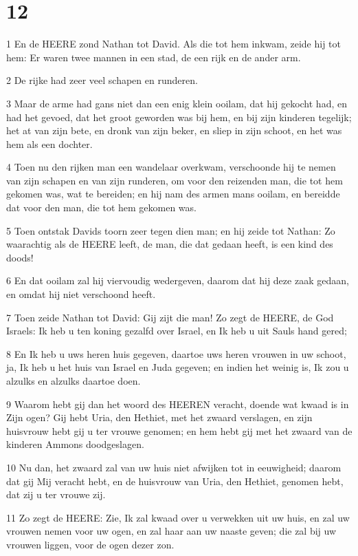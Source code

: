 \chapter{12}

\par 1 En de HEERE zond Nathan tot David. Als die tot hem inkwam, zeide hij tot hem: Er waren twee mannen in een stad, de een rijk en de ander arm.
\par 2 De rijke had zeer veel schapen en runderen.
\par 3 Maar de arme had gans niet dan een enig klein ooilam, dat hij gekocht had, en had het gevoed, dat het groot geworden was bij hem, en bij zijn kinderen tegelijk; het at van zijn bete, en dronk van zijn beker, en sliep in zijn schoot, en het was hem als een dochter.
\par 4 Toen nu den rijken man een wandelaar overkwam, verschoonde hij te nemen van zijn schapen en van zijn runderen, om voor den reizenden man, die tot hem gekomen was, wat te bereiden; en hij nam des armen mans ooilam, en bereidde dat voor den man, die tot hem gekomen was.
\par 5 Toen ontstak Davids toorn zeer tegen dien man; en hij zeide tot Nathan: Zo waarachtig als de HEERE leeft, de man, die dat gedaan heeft, is een kind des doods!
\par 6 En dat ooilam zal hij viervoudig wedergeven, daarom dat hij deze zaak gedaan, en omdat hij niet verschoond heeft.
\par 7 Toen zeide Nathan tot David: Gij zijt die man! Zo zegt de HEERE, de God Israels: Ik heb u ten koning gezalfd over Israel, en Ik heb u uit Sauls hand gered;
\par 8 En Ik heb u uws heren huis gegeven, daartoe uws heren vrouwen in uw schoot, ja, Ik heb u het huis van Israel en Juda gegeven; en indien het weinig is, Ik zou u alzulks en alzulks daartoe doen.
\par 9 Waarom hebt gij dan het woord des HEEREN veracht, doende wat kwaad is in Zijn ogen? Gij hebt Uria, den Hethiet, met het zwaard verslagen, en zijn huisvrouw hebt gij u ter vrouwe genomen; en hem hebt gij met het zwaard van de kinderen Ammons doodgeslagen.
\par 10 Nu dan, het zwaard zal van uw huis niet afwijken tot in eeuwigheid; daarom dat gij Mij veracht hebt, en de huisvrouw van Uria, den Hethiet, genomen hebt, dat zij u ter vrouwe zij.
\par 11 Zo zegt de HEERE: Zie, Ik zal kwaad over u verwekken uit uw huis, en zal uw vrouwen nemen voor uw ogen, en zal haar aan uw naaste geven; die zal bij uw vrouwen liggen, voor de ogen dezer zon.
